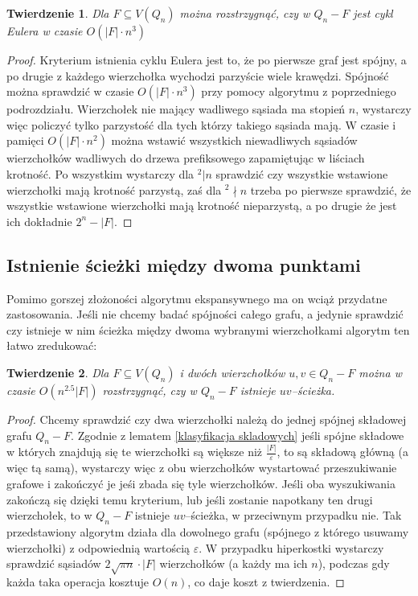 \documentclass{pracamgr}
\newtheorem{theorem}{Twierdzenie}
\begin{document}
    \begin{theorem}\label{cykl Eulera}%
     Dla $F\subseteq V(Q_n)$ można rozstrzygnąć, czy w $Q_n-F$ jest cykl Eulera w czasie $O(|F|\cdot n^3)$
    \end{theorem}
    \begin{proof}
     Kryterium istnienia cyklu Eulera jest to, że po pierwsze graf jest spójny, a po drugie z każdego wierzchołka wychodzi parzyście wiele krawędzi.
     Spójność można sprawdzić w czasie $O(|F|\cdot n^3)$ przy pomocy algorytmu z poprzedniego podrozdziału.
     Wierzchołek nie mający wadliwego sąsiada ma stopień $n$, wystarczy więc policzyć tylko parzystość dla tych którzy takiego sąsiada mają.
     W czasie i pamięci $O(|F|\cdot n^2)$ można wstawić wszystkich niewadliwych sąsiadów wierzchołków wadliwych
     do drzewa prefiksowego zapamiętując w liściach krotność.
     Po wszystkim wystarczy dla $^2|n$ sprawdzić czy wszystkie wstawione wierzchołki mają krotność parzystą, zaś dla $^2\nmid n$ trzeba po pierwsze sprawdzić,
     że wszystkie wstawione wierzchołki mają krotność nieparzystą, a po drugie że jest ich dokładnie $2^n-|F|$.
    \end{proof}
   \subsection{Istnienie ścieżki między dwoma punktami}
    Pomimo gorszej złożoności algorytmu ekspansywnego ma on wciąż przydatne zastosowania. Jeśli nie chcemy badać spójności całego grafu, a jedynie sprawdzić
    czy istnieje w nim ścieżka między dwoma wybranymi wierzchołkami algorytm ten łatwo zredukować:
    \begin{theorem}
     Dla $F\subseteq V(Q_n)$ i dwóch wierzchołków $u,v\in Q_n-F$ można w czasie $O(n^{2.5}|F|)$ rozstrzygnąć, czy w $Q_n-F$ istnieje $uv$--ścieżka.
    \end{theorem}
    \begin{proof}
     Chcemy sprawdzić czy dwa wierzchołki należą do jednej spójnej składowej grafu $Q_n-F$. Zgodnie z lematem \ref{klasyfikacja skladowych}
     jeśli spójne składowe w których znajdują się te wierzchołki są większe niż $\frac{|F|}{\varepsilon}$, to są składową główną (a więc tą samą),
     wystarczy więc z obu wierzchołków wystartować przeszukiwanie grafowe i zakończyć je jeśi zbada się tyle wierzchołków.
     Jeśli oba wyszukiwania zakończą się dzięki temu kryterium, lub jeśli zostanie napotkany ten drugi wierzchołek, to w $Q_n-F$ istnieje $uv$--ścieżka,
     w przeciwnym przypadku nie. Tak przedstawiony algorytm działa dla dowolnego grafu (spójnego z którego usuwamy wierzchołki)
     z odpowiednią wartością $\varepsilon$. W przypadku hiperkostki wystarczy sprawdzić sąsiadów $2\sqrt{\pi n}\cdot|F|$ wierzchołków (a każdy ma ich $n$),
     podczas gdy każda taka operacja kosztuje $O(n)$, co daje koszt z twierdzenia.
    \end{proof}    
\end{document}
